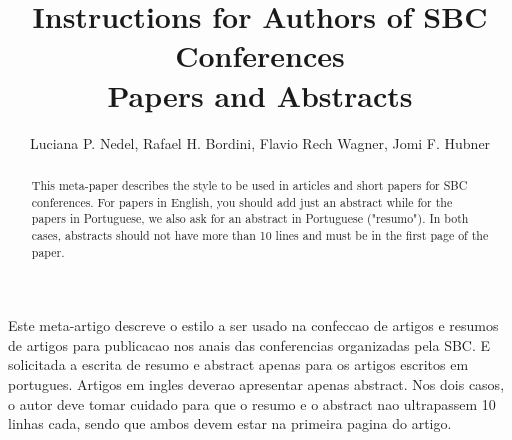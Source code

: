 \title{Instructions for Authors of SBC Conferences\\ Papers and Abstracts}

\author{Luciana P. Nedel, Rafael H. Bordini, Flavio Rech Wagner, Jomi F. Hubner}

\address{Instituto de Informatica -- Universidade Federal do Rio Grande do Sul (UFRGS)\\
Caixa Postal 15.064 -- 91.501-970 -- Porto Alegre -- RS -- Brazil
\nextinstitute
Department of Computer Science -- University of Durham\\
Durham, U.K.
\nextinstitute
Departamento de Sistemas e Computacao\\
Universidade Regional de Blumenal (FURB) -- Blumenau, SC -- Brazil
}

\maketitle

\begin{abstract}
This meta-paper describes the style to be used in articles and short papers for SBC conferences. For papers in English, you should add just an abstract while for the papers in Portuguese, we also ask for an abstract in Portuguese ("resumo"). In both cases, abstracts should not have more than 10 lines and must be in the first page of the paper.
\end{abstract}

\begin{resumo}
Este meta-artigo descreve o estilo a ser usado na confeccao de artigos e resumos de artigos para publicacao nos anais das conferencias organizadas pela SBC. E solicitada a escrita de resumo e abstract apenas para os artigos escritos em portugues. Artigos em ingles deverao apresentar apenas abstract. Nos dois casos, o autor deve tomar cuidado para que o resumo e o abstract nao ultrapassem 10 linhas cada, sendo que ambos devem estar na primeira pagina do artigo.
\end{resumo}
